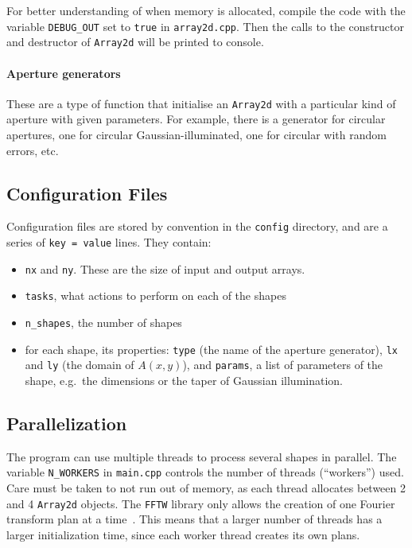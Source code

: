 \documentclass{article}
\begin{document}
For better understanding of when memory is allocated, compile the code with the variable \texttt{DEBUG\_OUT} set to \texttt{true} in \texttt{array2d.cpp}. Then the calls to the constructor and destructor of \texttt{Array2d} will be printed to console.

\paragraph{Aperture generators} These are a type of function that initialise an \texttt{Array2d} with a particular kind of aperture with given parameters. For example, there is a generator for circular apertures, one for circular Gaussian-illuminated, one for circular with random errors, etc.

\subsection{Configuration Files}
Configuration files are stored by convention in the \texttt{config} directory, and are a series of \texttt{key = value} lines. They contain:
\begin{itemize}
    \item \texttt{nx} and \texttt{ny}. These are the size of input and output arrays.
    \item \texttt{tasks}, what actions to perform on each of the shapes
    \item \texttt{n\_shapes}, the number of shapes
    \item for each shape, its properties: \texttt{type} (the name of the aperture generator), \texttt{lx} and \texttt{ly} (the domain of $A(x,y)$), and \texttt{params}, a list of parameters of the shape, e.g.\ the dimensions or the taper of Gaussian illumination.
\end{itemize}

\subsection{Parallelization}
The program can use multiple threads to process several shapes in parallel. The variable \texttt{N\_WORKERS} in \texttt{main.cpp} controls the number of threads (``workers'') used. Care must be taken to not run out of memory, as each thread allocates between 2 and 4 \texttt{Array2d} objects. The \texttt{FFTW} library only allows the creation of one Fourier transform plan at a time~\cite[Section 5]{fftw}. This means that a larger number of threads has a larger initialization time, since each worker thread creates its own plans.
\end{document}
